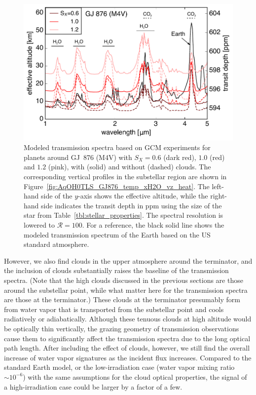 \documentclass[11pt,numberedappendix,twocolappendix,]{emulateapj}
\def\wv{water vapor}
\begin{document}
\begin{figure}[!b]
    \begin{center}
    \includegraphics[width=\hsize]{transit_GJ876_USstandard_labels.pdf}
    \end{center}
\caption{Modeled transmission spectra based on GCM experiments for planets around GJ~876 (M4V) with $S_X=0.6$ (dark red), $1.0$ (red) and $1.2$ (pink), with (solid) and without (dashed) clouds. The corresponding vertical profiles in the substellar region are shown in Figure~\ref{fig:AqOH0TLS_GJ876_temp_xH2O_vz_heat}. The left-hand side of the $y$-axis shows the effective altitude, while the right-hand side indicates the transit depth in ppm using the size of the star from Table~\ref{tbl:stellar_properties}. The spectral resolution is lowered to $\mathcal{R}=100$.  For a reference, the black solid line shows the modeled transmission spectrum of the Earth based on the US standard atmosphere. }
\label{fig:transmission}
\end{figure}


However, we also find clouds in the upper atmosphere around the terminator, and the inclusion of clouds substantially raises the baseline of the transmission spectra. 
(Note that the high clouds discussed in the previous sections are those around the substellar point, while what matter here for the transmission spectra are those at the terminator.) 
These clouds at the terminator presumably form from water vapor that is transported from the substellar point and cools radiatively or adiabatically. 
Although these tenuous clouds at high altitude would be optically thin vertically, the grazing geometry of transmission observations cause them to significantly affect the transmission spectra due to the long optical path length. 
After including the effect of clouds, however, we still find the overall increase of water vapor signatures as the incident flux increases. 
Compared to the standard Earth model, or the low-irradiation case (\wv{} mixing ratio $\sim 10^{-6}$) with the same assumptions for the cloud optical properties, the signal of a high-irradiation case could be larger by a factor of a few. 
\end{document}
